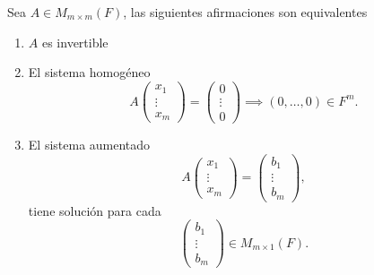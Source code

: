 \documentclass[12pt,a4paper]{book}
\begin{document}
    \begin{teorema}
        Sea $A\in M_{m\times m}(F)$, las siguientes afirmaciones son equivalentes
        \begin{enumerate}
            \item[$(i)$] $A$ es invertible
            \item[$(ii)$] El sistema homogéneo
            \begin{equation*}
                A
                \begin{pmatrix}
                    x_{1}\\
                    \vdots\\
                    x_{m}
                \end{pmatrix}
                =
                \begin{pmatrix}
                    0\\
                    \vdots\\
                    0
                \end{pmatrix}
                \implies (0,\dots,0)\in F^{m}.
            \end{equation*}
            \item[$(iii)$] El sistema aumentado
            \begin{equation*}
                A
                \begin{pmatrix}
                    x_{1}\\
                    \vdots\\
                    x_{m}
                \end{pmatrix}
                =
                \begin{pmatrix}
                    b_{1}\\
                    \vdots\\
                    b_{m}
                \end{pmatrix},
            \end{equation*}
            tiene solución para cada
            \begin{equation*}
                \begin{pmatrix}
                    b_{1}\\
                    \vdots\\
                    b_{m}
                \end{pmatrix}
                \in M_{m\times 1}(F).
            \end{equation*}
        \end{enumerate}
    \end{teorema}
\end{document}
